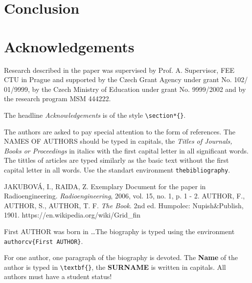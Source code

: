 \documentclass{poster16}
\begin{document}
\section{Conclusion}






\section*{Acknowledgements}
Research described in the paper was supervised by Prof. A. Supervisor, FEE CTU in Prague and supported by the Czech Grant Agency under grant No. 102/ 01/9999, by the Czech Ministry of Education under grant No. 9999/2002 and by the research program MSM 444222.

The headline \emph{Acknowledgements} is of the  style \verb+\section*{}+.

The authors are asked to pay special attention to the form of references. The NAMES OF AUTHORS should be typed in capitals, the \emph{Titles of Journals, Books or Proceedings} in italics with the first capital letter in all significant words. The tittles of articles are typed similarly as the basic text without the first capital letter in all words. Use the standart environment \verb+thebibliography+.

\begin{thebibliography}{9}
JAKUBOV\'A, I., RAIDA, Z. Exemplary Document for the paper in Radioengineering. \emph{Radioengineering}, 2006, vol. 15, no. 1, p. 1 - 2.
AUTHOR, F., AUTHOR, S., AUTHOR, T. F. \emph{The Book}. 2nd ed. Humpolec: Nupish\&Publish, 1901.
https://en.wikipedia.org/wiki/Grid\_fin
\end{thebibliography}


\begin{authorcv}{First AUTHOR}
was born in \dots The biography is typed using the environment \verb+authorcv{First AUTHOR}+. 

For one author, one paragraph of the biography is devoted. The \textbf{Name} of the author is typed in  \verb+\textbf{}+, the \textbf{SURNAME} is written in capitals.  All authors must have a student status!
\end{authorcv}
\end{document}
